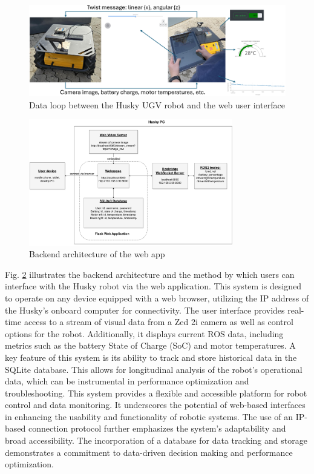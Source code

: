 \documentclass[conference]{IEEEtran}
\begin{document}
\begin{figure}[htbp]
    \centerline{\includegraphics[width=18.2cm]{Pictures/loop.png}}
    \caption{Data loop between the Husky UGV robot and the web user interface}
    \label{fig:loop}
\end{figure}

\begin{figure}[htbp]
    \centerline{\includegraphics[width=8.9cm]{Pictures/userappbig.pdf}}
    \caption{Backend architecture of the web app}
    \label{fig:userapp}
\end{figure}
Fig. \ref{fig:userapp} illustrates the backend architecture and the method by which users can interface with the Husky robot via the web application. This system is designed to operate on any device equipped with a web browser, utilizing the IP address of the Husky's onboard computer for connectivity.
The user interface provides real-time access to a stream of visual data from a Zed 2i camera as well as control options for the robot. Additionally, it displays current ROS data, including metrics such as the battery State of Charge (SoC) and motor temperatures.
A key feature of this system is its ability to track and store historical data in the SQLite database. This allows for longitudinal analysis of the robot's operational data, which can be instrumental in performance optimization and troubleshooting.
This system provides a flexible and accessible platform for robot control and data monitoring. It underscores the potential of web-based interfaces in enhancing the usability and functionality of robotic systems. 
The use of an IP-based connection protocol further emphasizes the system's adaptability and broad accessibility. The incorporation of a database for data tracking and storage demonstrates a commitment to data-driven decision making and performance optimization. 
\end{document}
